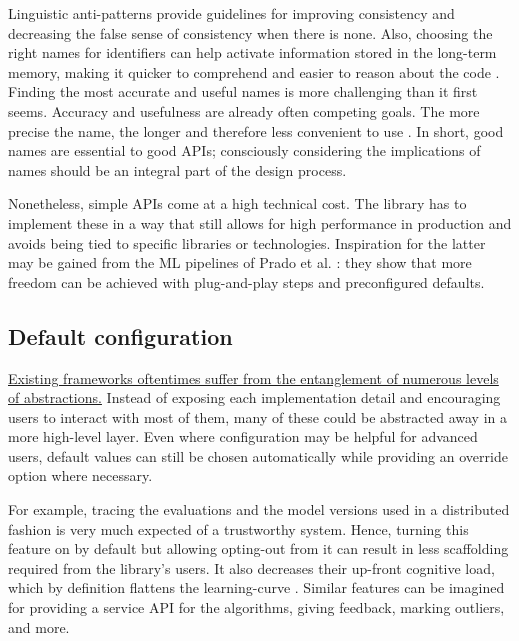 Linguistic anti-patterns provide guidelines for improving consistency and decreasing the false sense of consistency when there is none. Also, choosing the right names for identifiers can help activate information stored in the long-term memory, making it quicker to comprehend and easier to reason about the code \cite{deissenboeck2006concise}. Finding the most accurate and useful names is more challenging than it first seems. Accuracy and usefulness are already often competing goals. The more precise the name, the longer and therefore less convenient to use \cite{butler2009relating}. In short, good names are essential to good APIs; consciously considering the implications of names should be an integral part of the design process.

Nonetheless, simple APIs come at a high technical cost. The library has to implement these in a way that still allows for high performance in production \cite{kleppmann2017designing} and avoids being tied to specific libraries or technologies. Inspiration for the latter may be gained from the ML pipelines of Prado et al. \cite{prado2020bonseyes}: they show that more freedom can be achieved with plug-and-play steps and preconfigured defaults. 

\subsection{Default configuration}

\href{https://grugbrain.dev/#grug-on-apis}{Existing frameworks oftentimes suffer from the entanglement of numerous levels of abstractions.} Instead of exposing each implementation detail and encouraging users to interact with most of them, many of these could be abstracted away in a more high-level layer. Even where configuration may be helpful for advanced users, default values can still be chosen automatically while providing an override option where necessary.

For example, tracing the evaluations and the model versions used in a distributed fashion is very much expected of a trustworthy system. Hence, turning this feature on by default but allowing opting-out from it can result in less scaffolding required from the library's users. It also decreases their up-front cognitive load, which by definition flattens the learning-curve \cite{hermans2021programmer}. Similar features can be imagined for providing a service API for the algorithms, giving feedback, marking outliers, and more.

